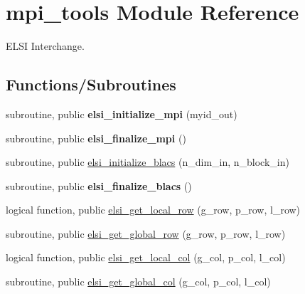 \hypertarget{namespacempi__tools}{}\section{mpi\+\_\+tools Module Reference}
\label{namespacempi__tools}


E\+L\+S\+I Interchange.  


\subsection*{Functions/\+Subroutines}
\begin{DoxyCompactItemize}
\item 
\hypertarget{namespacempi__tools_a339ffffa5553a6d0cc03bd478c4aad56}{}subroutine, public {\bfseries elsi\+\_\+initialize\+\_\+mpi} (myid\+\_\+out)\label{namespacempi__tools_a339ffffa5553a6d0cc03bd478c4aad56}

\item 
\hypertarget{namespacempi__tools_a64bd78c07c0715573d7517a2a130d609}{}subroutine, public {\bfseries elsi\+\_\+finalize\+\_\+mpi} ()\label{namespacempi__tools_a64bd78c07c0715573d7517a2a130d609}

\item 
subroutine, public \hyperlink{namespacempi__tools_a3b7b2751959e5478de68e76a1baabb9b}{elsi\+\_\+initialize\+\_\+blacs} (n\+\_\+dim\+\_\+in, n\+\_\+block\+\_\+in)
\item 
\hypertarget{namespacempi__tools_a12c0b5f94b66cdc0ef469691eeeb6f7f}{}subroutine, public {\bfseries elsi\+\_\+finalize\+\_\+blacs} ()\label{namespacempi__tools_a12c0b5f94b66cdc0ef469691eeeb6f7f}

\item 
logical function, public \hyperlink{namespacempi__tools_ad64b68016d44800009c91144353f0fc8}{elsi\+\_\+get\+\_\+local\+\_\+row} (g\+\_\+row, p\+\_\+row, l\+\_\+row)
\item 
subroutine, public \hyperlink{namespacempi__tools_a839b08ee7d36a54132ccb950c8f97278}{elsi\+\_\+get\+\_\+global\+\_\+row} (g\+\_\+row, p\+\_\+row, l\+\_\+row)
\item 
logical function, public \hyperlink{namespacempi__tools_a0fe5732ac6dc07b0132cd7375612a60c}{elsi\+\_\+get\+\_\+local\+\_\+col} (g\+\_\+col, p\+\_\+col, l\+\_\+col)
\item 
subroutine, public \hyperlink{namespacempi__tools_ace6ebd211463804356231d4ebf3389d7}{elsi\+\_\+get\+\_\+global\+\_\+col} (g\+\_\+col, p\+\_\+col, l\+\_\+col)
\end{DoxyCompactItemize}
